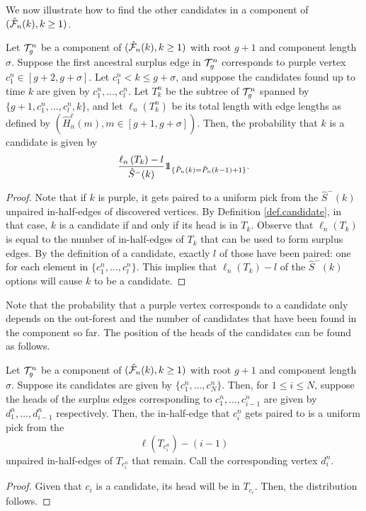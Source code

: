 We now illustrate how to find the other candidates in a component of $(\hat{{\mathcal F}}_n(k),k\geq 1)$. 
\begin{lemma}\label{lemma.samplecandidates}
Let ${\mathcal T}^n_g$ be a component of $(\hat{{\mathcal F}}_n(k),k\geq 1)$ with root $g+1$ and component length $\sigma$. Suppose the first ancestral surplus edge in ${\mathcal T}^n_g$ corresponds to purple vertex $c^n_1\in [g+2,g+\sigma]$. Let $c^n_1<k\leq g+\sigma$, and suppose the candidates found up to time $k$ are given by $c^n_1,\dots,c^n_l$. Let $T^n_k$ be the subtree of ${\mathcal T}^n_g$ spanned by $\{g+1,c^n_1,\dots,c^n_l,k\}$, and let $\ell_n(T^n_k)$ be its total length with edge lengths as defined by $(\hat{H}^\ell_n(m),m\in [g+1,g+\sigma])$. Then, the probability that $k$ is a candidate is given by 
$$\frac{\ell_n\left(T_{k}\right)-l}{\hat{S}^-(k)}\one_{\{\hat{P}_n(k)=\hat{P}_n(k-1)+1\}}.$$
\end{lemma}
\begin{proof}
Note that if $k$ is purple, it gets paired to a uniform pick from the $\hat{S}^-(k)$ unpaired in-half-edges of discovered vertices. By Definition \ref{def.candidate}, in that case, $k$ is a candidate if and only if its head is in $T_k$. Observe that $\ell_n\left(T_{k}\right)$ is equal to the number of in-half-edges of $T_{k}$ that can be used to form surplus edges. By the definition of a candidate, exactly $l$ of those have been paired: one for each element in $\{c^n_1,\dots,c^n_l\}$. This implies that $\ell_n\left(T_{k}\right)-l$ of the $\hat{S}^-(k)$ options will cause $k$ to be a candidate.
\end{proof}

Note that the probability that a purple vertex corresponds to a candidate only depends on the out-forest and the number of candidates that have been found in the component so far. The position of the heads of the candidates can be found as follows.
\begin{lemma}\label{lemma.sampleheadcandidates}
Let ${\mathcal T}^n_g$ be a component of $(\hat{{\mathcal F}}_n(k),k\geq 1)$ with root $g+1$ and component length $\sigma$. Suppose its candidates are given by $\{c^n_1,\dots,c^n_{N}\}$. Then, for $1\leq i\leq {N}$, suppose the heads of the surplus edges corresponding to $c^n_1,\dots,c^n_{i-1}$ are given by $d_1^n,\dots,d^n_{i-1}$ respectively. Then, the in-half-edge that $c^n_{i}$ gets paired to is a uniform pick from the $$\ell\left(T_{c^n_{i}}\right)-(i-1)$$ unpaired in-half-edges of $T_{c^n_{i}}$ that remain. Call the corresponding vertex $d^n_i$.
\end{lemma}
\begin{proof}
Given that $c_{i}$ is a candidate, its head will be in $T_{c_{i}}$. Then, the distribution follows.
\end{proof}

